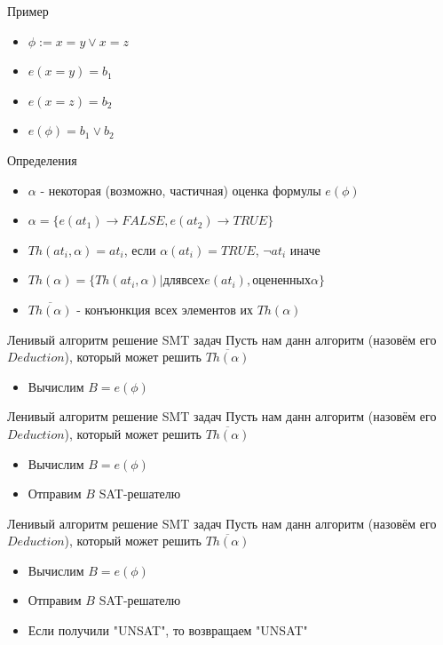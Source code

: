 \documentclass{beamer}
\begin{document}
\begin{frame}{Пример}
\begin{itemize}
\item $\phi := x = y \vee x = z$
\item $e(x = y) = b_1$
\item $e(x = z) = b_2$
\item $e(\phi) = b_1 \vee b_2$
\end{itemize}
\end{frame}

\begin{frame}{Определения}
\begin{itemize}
\item $\alpha$ - некоторая (возможно, частичная) оценка формулы $e(\phi)$
\item $\alpha = \{e(at_1) \rightarrow FALSE, e(at_2) \rightarrow TRUE\}$
\item $Th(at_i, \alpha) = at_i$, если $\alpha(at_i) = TRUE$, $\lnot at_i$ иначе
\item $Th(\alpha) = \{Th(at_i, \alpha)| для всех e(at_i), оцененных \alpha\}$
\item $\overline{Th(\alpha)}$ - конъюнкция всех элементов их $Th(\alpha)$
\end{itemize}
\end{frame}

\begin{frame}{Ленивый алгоритм решение SMT задач}
Пусть нам данн алгоритм (назовём его $Deduction$), который может решить $\overline{Th(\alpha)}$
\begin{itemize}
\item Вычислим $B = e(\phi)$
\end{itemize}
\end{frame}

\begin{frame}{Ленивый алгоритм решение SMT задач}
Пусть нам данн алгоритм (назовём его $Deduction$), который может решить $\overline{Th(\alpha)}$
\begin{itemize}
\item Вычислим $B = e(\phi)$
\item Отправим $B$ SAT-решателю
\end{itemize}
\end{frame}

\begin{frame}{Ленивый алгоритм решение SMT задач}
Пусть нам данн алгоритм (назовём его $Deduction$), который может решить $\overline{Th(\alpha)}$
\begin{itemize}
\item Вычислим $B = e(\phi)$
\item Отправим $B$ SAT-решателю
\item Если получили "UNSAT", то возвращаем "UNSAT"
\end{itemize}
\end{frame}
\end{document}
